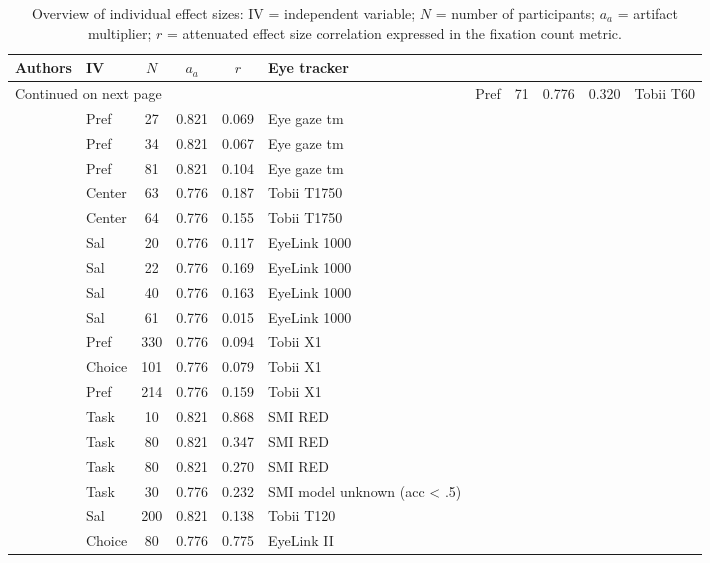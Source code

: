 \begin{longtable}{p{8cm}lcccl}
\caption{Overview of individual effect sizes: IV = independent variable; $N$ = number of participants; $a_a$ = artifact multiplier; $r$ = attenuated effect size correlation expressed in the fixation count metric.} \\ 
  \hline
Authors & IV & $N$ & $a_a$ & $r$ & Eye tracker \\ 
  \hline
\endhead
\hline
\multicolumn{6}{l}{\footnotesize Continued on next page}
\endfoot
\endlastfoot
 \hline
\cite{ares2014} & Pref & 71 & 0.776 & 0.320 & Tobii T60 \\ 
  \cite{ashby2015} & Pref & 27 & 0.821 & 0.069 & Eye gaze tm \\ 
  \cite{ashby2015} & Pref & 34 & 0.821 & 0.067 & Eye gaze tm \\ 
  \cite{ashby2015} & Pref & 81 & 0.821 & 0.104 & Eye gaze tm \\ 
  \cite{atalay2012a} & Center & 63 & 0.776 & 0.187 & Tobii T1750 \\ 
  \cite{atalay2012a} & Center & 64 & 0.776 & 0.155 & Tobii T1750 \\ 
  \cite{bagger2016} & Sal & 20 & 0.776 & 0.117 & EyeLink 1000 \\ 
  \cite{bagger2016} & Sal & 22 & 0.776 & 0.169 & EyeLink 1000 \\ 
  \cite{bagger2016} & Sal & 40 & 0.776 & 0.163 & EyeLink 1000 \\ 
  \cite{bagger2016} & Sal & 61 & 0.776 & 0.015 & EyeLink 1000 \\ 
  \cite{behe2014} & Pref & 330 & 0.776 & 0.094 & Tobii X1 \\ 
  \cite{behe2015} & Choice & 101 & 0.776 & 0.079 & Tobii X1 \\ 
  \cite{behe2017} & Pref & 214 & 0.776 & 0.159 & Tobii X1 \\ 
  \cite{bialkova2011} & Task & 10 & 0.821 & 0.868 & SMI RED \\ 
  \cite{bialkova2014a} & Task & 80 & 0.821 & 0.347 & SMI RED \\ 
  \cite{bialkova2014a} & Task & 80 & 0.821 & 0.270 & SMI RED \\ 
  \cite{bialkova2020} & Task & 30 & 0.776 & 0.232 & SMI model unknown (acc < .5) \\ 
  \cite{bogomolova2020} & Sal & 200 & 0.821 & 0.138 & Tobii T120 \\ 
  \cite{brandstatter2014} & Choice & 80 & 0.776 & 0.775 & EyeLink II \\ 

\end{longtable}

